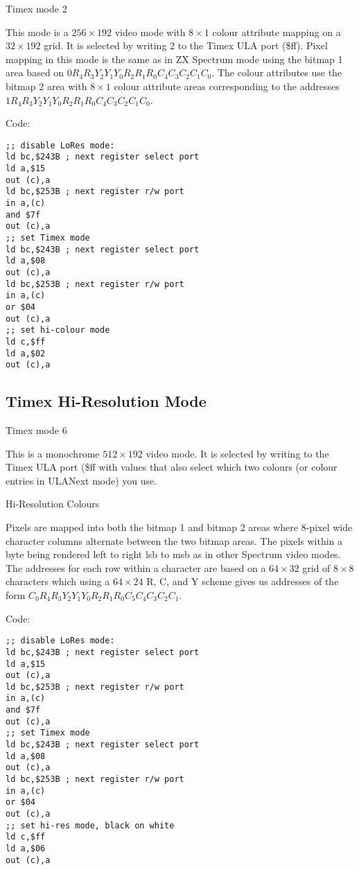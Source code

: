 Timex mode 2

This mode is a $256\times192$ video mode with $8\times1$ colour
attribute mapping on a $32\times192$ grid. It is selected by writing 2
to the Timex ULA port (\$ff).  Pixel mapping in this mode is the same
as in ZX Spectrum mode using the bitmap 1 area based on
$0R_4R_3Y_2Y_1Y_0R_2R_1R_0C_4C_3C_2C_1C_0$.  The colour attributes use
the bitmap 2 area with $8\times1$ colour attribute areas corresponding
to the addresses $1R_4R_3Y_2Y_1Y_0R_2R_1R_0C_4C_3C_2C_1C_0$.

Code:
\begin{verbatim}
;; disable LoRes mode:
ld bc,$243B ; next register select port
ld a,$15
out (c),a
ld bc,$253B ; next register r/w port
in a,(c)
and $7f
out (c),a
;; set Timex mode
ld bc,$243B ; next register select port
ld a,$08
out (c),a
ld bc,$253B ; next register r/w port
in a,(c)
or $04
out (c),a
;; set hi-colour mode
ld c,$ff
ld a,$02
out (c),a
\end{verbatim}

\subsection{Timex Hi-Resolution Mode}

Timex mode 6

This is a monochrome $512\times192$ video mode. It is selected by
writing to the Timex ULA port (\$ff with values that also select which
two colours (or colour entries in ULANext mode) you use.

\begin{table}[h]\centering
  \caption{Hi-Resolution Colours}
\end{table}
  
Pixels are mapped into both the bitmap 1 and bitmap 2 areas where
8-pixel wide character columns alternate between the two bitmap areas.
The pixels within a byte being rendered left to right lsb to msb as in
other Spectrum video modes.  The addresses for each row within a
character are based on a $64\times32$ grid of $8\times8$ characters
which using a $64\times24$ R, C, and Y scheme gives us addresses of
the form $C_0R_4R_3Y_2Y_1Y_0R_2R_1R_0C_5C_4C_3C_2C_1$.

Code:
\begin{verbatim}
;; disable LoRes mode:
ld bc,$243B ; next register select port
ld a,$15
out (c),a
ld bc,$253B ; next register r/w port
in a,(c)
and $7f
out (c),a
;; set Timex mode
ld bc,$243B ; next register select port
ld a,$08
out (c),a
ld bc,$253B ; next register r/w port
in a,(c)
or $04
out (c),a
;; set hi-res mode, black on white
ld c,$ff
ld a,$06
out (c),a
\end{verbatim}

